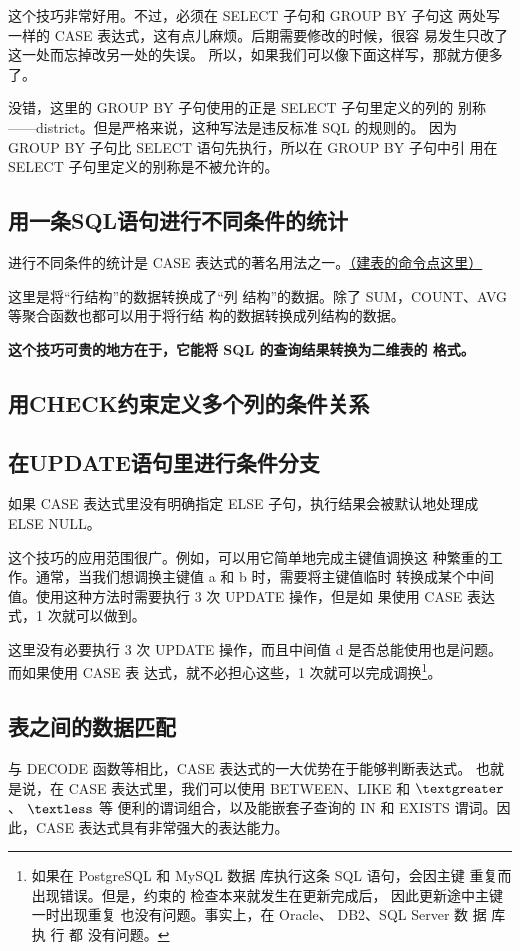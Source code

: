 这个技巧非常好用。不过，必须在 SELECT 子句和 GROUP BY 子句这
两处写一样的 CASE 表达式，这有点儿麻烦。后期需要修改的时候，很容
易发生只改了这一处而忘掉改另一处的失误。
所以，如果我们可以像下面这样写，那就方便多了。


没错，这里的 GROUP BY 子句使用的正是 SELECT 子句里定义的列的
别称——district。但是严格来说，这种写法是违反标准 SQL 的规则的。
因为 GROUP BY 子句比 SELECT 语句先执行，所以在 GROUP BY 子句中引
用在 SELECT 子句里定义的别称是不被允许的。

\subsection{用一条SQL语句进行不同条件的统计}
进行不同条件的统计是 CASE 表达式的著名用法之一。\href{https://github.com/JPL-JUNO/SQL/blob/main/ASQLP/PopTbl2.sql}{（建表的命令点这里）}


这里是将“行结构”的数据转换成了“列
结构”的数据。除了 SUM，COUNT、AVG 等聚合函数也都可以用于将行结
构的数据转换成列结构的数据。

\textbf{这个技巧可贵的地方在于，它能将 SQL 的查询结果转换为二维表的
      格式。}
\subsection{用CHECK约束定义多个列的条件关系}
\subsection{在UPDATE语句里进行条件分支}
如果 CASE 表达式里没有明确指定 ELSE 子句，执行结果会被默认地处理成 ELSE NULL。

这个技巧的应用范围很广。例如，可以用它简单地完成主键值调换这
种繁重的工作。通常，当我们想调换主键值 a 和 b 时，需要将主键值临时
转换成某个中间值。使用这种方法时需要执行 3 次 UPDATE 操作，但是如
果使用 CASE 表达式，1 次就可以做到。

这里没有必要执行 3 次
UPDATE 操作，而且中间值 d 是否总能使用也是问题。而如果使用 CASE 表
达式，就不必担心这些，1 次就可以完成调换\footnote{如果在 PostgreSQL 和 MySQL 数据
      库执行这条 SQL 语句，会因主键
      重复而出现错误。但是，约束的
      检查本来就发生在更新完成后，
      因此更新途中主键一时出现重复
      也没有问题。事实上，在 Oracle、
      DB2、SQL Server 数 据 库 执 行 都
      没有问题。}。

\subsection{表之间的数据匹配}
与 DECODE 函数等相比，CASE 表达式的一大优势在于能够判断表达式。
也就是说，在 CASE 表达式里，我们可以使用 BETWEEN、LIKE 和 $\textgreater$、 $\textless$ 等
便利的谓词组合，以及能嵌套子查询的 IN 和 EXISTS 谓词。因此，CASE
表达式具有非常强大的表达能力。

